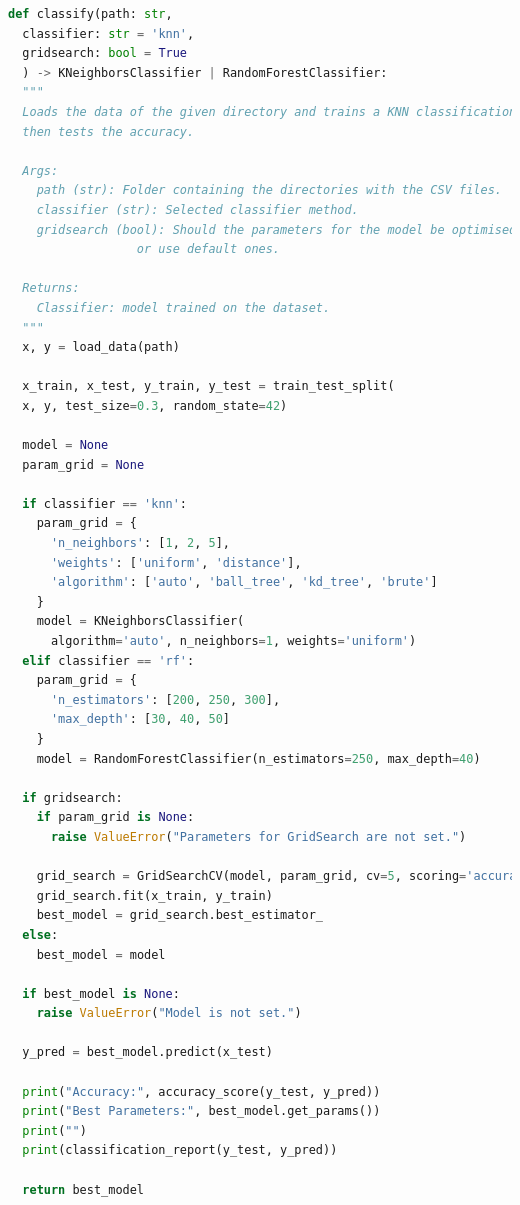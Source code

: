 \documentclass[11pt,
  oneside,openany,    %
]{scrreprt}
\begin{document}
\begin{lstlisting}[language=python, caption=Classifier Function, label=lst:classifier]
def classify(path: str,
  classifier: str = 'knn',
  gridsearch: bool = True
  ) -> KNeighborsClassifier | RandomForestClassifier:
  """
  Loads the data of the given directory and trains a KNN classification algorithm, 
  then tests the accuracy. 

  Args:
    path (str): Folder containing the directories with the CSV files.
    classifier (str): Selected classifier method.
    gridsearch (bool): Should the parameters for the model be optimised via gridsearch 
                  or use default ones.

  Returns:
    Classifier: model trained on the dataset.
  """
  x, y = load_data(path)

  x_train, x_test, y_train, y_test = train_test_split(
  x, y, test_size=0.3, random_state=42)

  model = None
  param_grid = None

  if classifier == 'knn':
    param_grid = {
      'n_neighbors': [1, 2, 5],
      'weights': ['uniform', 'distance'],
      'algorithm': ['auto', 'ball_tree', 'kd_tree', 'brute']
    }
    model = KNeighborsClassifier(
      algorithm='auto', n_neighbors=1, weights='uniform')
  elif classifier == 'rf':
    param_grid = {
      'n_estimators': [200, 250, 300],
      'max_depth': [30, 40, 50]
    }
    model = RandomForestClassifier(n_estimators=250, max_depth=40)

  if gridsearch:
    if param_grid is None:
      raise ValueError("Parameters for GridSearch are not set.")

    grid_search = GridSearchCV(model, param_grid, cv=5, scoring='accuracy')
    grid_search.fit(x_train, y_train)
    best_model = grid_search.best_estimator_
  else:
    best_model = model

  if best_model is None:
    raise ValueError("Model is not set.")

  y_pred = best_model.predict(x_test)

  print("Accuracy:", accuracy_score(y_test, y_pred))
  print("Best Parameters:", best_model.get_params())
  print("")
  print(classification_report(y_test, y_pred))

  return best_model
\end{lstlisting}
\end{document}

